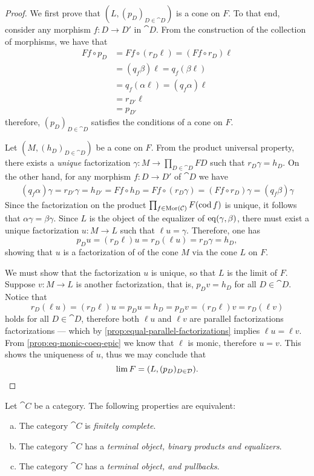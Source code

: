 \begin{proof}
We first prove that \((L, (p_D)_{D \in \cat D})\) is a cone on \(F\). To that
end, consider any morphism \(f: D \to D'\) in \(\cat D\). From the construction
of the collection of morphisms, we have that
\begin{align*}
F f \circ p_D
&= F f \circ (r_D \ell)
= (F f \circ r_D) \ell \\
&= (q_f \beta) \ell
= q_f (\beta \ell) \\
&= q_f (\alpha \ell)
= (q_f \alpha) \ell \\
&= r_{D'} \ell \\
&= p_{D'}
\end{align*}
therefore, \((p_D)_{D \in \cat D}\) satisfies the conditions of a cone on \(F\).

Let \((M, (h_D)_{D \in \cat D})\) be a cone on \(F\). From the product universal
property, there exists a \emph{unique} factorization
\(\gamma: M \to \prod_{D \in \cat D} F D\) such that \(r_D \gamma = h_D\). On
the other hand, for any morphism \(f: D \to D'\) of \(\cat D\) we have
\begin{align*}
  (q_f \alpha) \gamma
  = r_{D'} \gamma
  = h_{D'}
  = F f \circ h_D
  = F f \circ (r_D \gamma)
  = (F f \circ r_D) \gamma
  = (q_f \beta) \gamma
\end{align*}
Since the factorization on the product \(\prod_{f \in \operatorname{Mor}(\mathcal C)} F(\operatorname{cod}
f)\) is unique, it follows that \(\alpha \gamma = \beta \gamma\). Since \(L\) is
the object of the equalizer of \(\operatorname{eq}(\gamma, \beta)\), there must exist a unique
factorization \(u: M \to L\) such that \(\ell u = \gamma\). Therefore, one has
\[
p_D u  = (r_D \ell) u = r_D (\ell u) = r_D \gamma = h_D,
\]
showing that \(u\) is a factorization of of the cone \(M\) via the cone \(L\) on
\(F\).

We must show that the factorization \(u\) is unique, so that \(L\) is the limit
of \(F\). Suppose \(v: M \to L\) is another factorization, that is, \(p_D v =
h_D\) for all \(D \in \cat D\). Notice that
\[
r_D (\ell u)
= (r_D \ell) u
= p_D u
= h_D
= p_D v
= (r_D \ell) v
= r_D (\ell v)
\]
holds for all \(D \in \cat D\), therefore both \(\ell u\) and \(\ell v\) are
parallel factorizations factorizations --- which by
\cref{prop:equal-parallel-factorizations} implies \(\ell u = \ell v\).
From \cref{prop:eq-monic-coeq-epic} we know that \(\ell\) is monic, therefore
\(u = v\). This shows the uniqueness of \(u\), thus we may conclude that
\[
\operatorname{lim} F = (L, (p_D)_{D \in \mathcal D}).
\]
\end{proof}

\begin{proposition}
\label{prop:equiv-cat-finitely-complete}
Let \(\cat C\) be a category. The following properties are equivalent:
\begin{enumerate}[(a)]\setlength\itemsep{0em}
\item The category \(\cat C\) is \emph{finitely complete}.
\item The category \(\cat C\) has a \emph{terminal object, binary
    products and equalizers}.
\item The category \(\cat C\) has a \emph{terminal object, and pullbacks}.
\end{enumerate}
\end{proposition}

